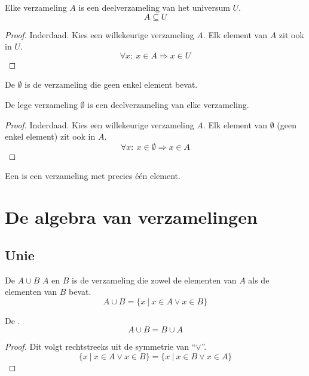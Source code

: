 \documentclass[main.tex]{subfiles}
\begin{document}
\begin{st}
  Elke verzameling $A$ is een deelverzameling van het universum $U$.
  \[ A \subseteq U \]
  \begin{proof}
    Inderdaad. Kies een willekeurige verzameling $A$. 
    Elk element van $A$ zit ook in $U$.
    \[
    \forall x:\ x \in A \Rightarrow x \in U
    \]
  \end{proof}
\end{st}

\begin{de}
  De  $\emptyset$ is de verzameling die geen enkel element bevat.
\end{de}

\begin{st}
  De lege verzameling $\emptyset$ is een deelverzameling van elke verzameling.
  \begin{proof}
    Inderdaad. Kies een willekeurige verzameling $A$.
    Elk element van $\emptyset$ (geen enkel element) zit ook in $A$.
    \[
    \forall x:\ x \in \emptyset \Rightarrow x \in A
    \]
  \end{proof}
\end{st}

\begin{de}
  Een  is een verzameling met precies \'e\'en element.
\end{de}

\section{De algebra van verzamelingen}
\label{sec:de-algebra-van-verzamelingen}

\subsection{Unie}
\label{sec:unie}

\begin{de}
  De  $A \cup B$  $A$ en $B$ is de verzameling die zowel de elementen van $A$ als de elementen van $B$ bevat.
  \[ A \cup B = \{ x\ |\ x \in A \vee x \in B\} \]
\end{de}

\begin{ei}
  De .
  \[ A \cup B = B \cup A \]
  \begin{proof}
    Dit volgt rechtstreeks uit de symmetrie van ``$\vee$''.
    \[ \{ x\ |\ x \in A \vee x \in B\} = \{ x\ |\ x \in B \vee x \in A\} \]
  \end{proof}
\end{ei}
\end{document}
